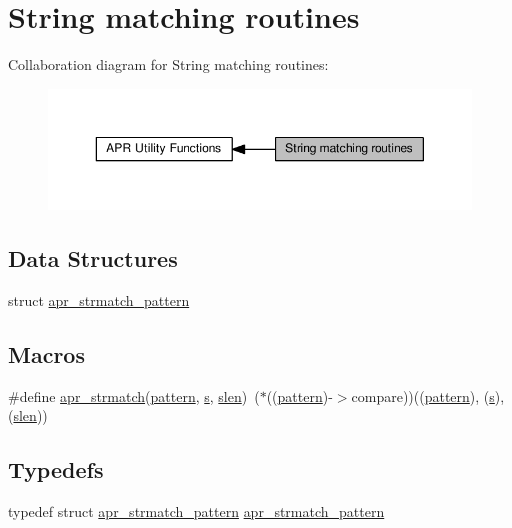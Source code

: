 \hypertarget{group__APR__Util__StrMatch}{}\section{String matching routines}
\label{group__APR__Util__StrMatch}
Collaboration diagram for String matching routines\+:
\nopagebreak
\begin{figure}[H]
\begin{center}
\leavevmode
\includegraphics[width=350pt]{group__APR__Util__StrMatch}
\end{center}
\end{figure}
\subsection*{Data Structures}
\begin{DoxyCompactItemize}
\item 
struct \hyperlink{structapr__strmatch__pattern}{apr\+\_\+strmatch\+\_\+pattern}
\end{DoxyCompactItemize}
\subsection*{Macros}
\begin{DoxyCompactItemize}
\item 
\#define \hyperlink{group__APR__Util__StrMatch_gac9e03737adc693399f34b027d5288fa4}{apr\+\_\+strmatch}(\hyperlink{pcretest_8txt_a14415789461ee2ace28e34eea786cc6c}{pattern},  \hyperlink{pcretest_8txt_a062597889ba244b72877454b1d3adecf}{s},  \hyperlink{group__APR__Util__Escaping_ga00eba03f583932b8cdcec6e0847f08b3}{slen})~($\ast$((\hyperlink{pcretest_8txt_a14415789461ee2ace28e34eea786cc6c}{pattern})-\/$>$compare))((\hyperlink{pcretest_8txt_a14415789461ee2ace28e34eea786cc6c}{pattern}), (\hyperlink{pcretest_8txt_a062597889ba244b72877454b1d3adecf}{s}), (\hyperlink{group__APR__Util__Escaping_ga00eba03f583932b8cdcec6e0847f08b3}{slen}))
\end{DoxyCompactItemize}
\subsection*{Typedefs}
\begin{DoxyCompactItemize}
\item 
typedef struct \hyperlink{structapr__strmatch__pattern}{apr\+\_\+strmatch\+\_\+pattern} \hyperlink{group__APR__Util__StrMatch_gab7fc6f6d1b15c8d8750b4637b8ac5679}{apr\+\_\+strmatch\+\_\+pattern}
\end{DoxyCompactItemize}
